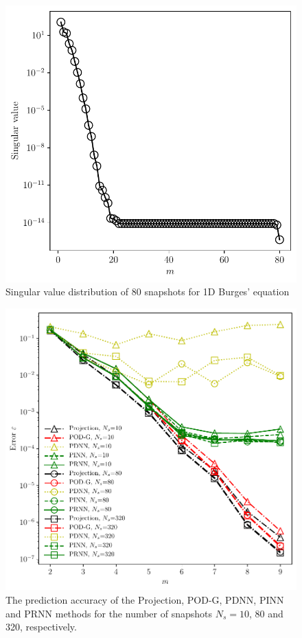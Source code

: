 \documentclass[preprint, 10pt]{elsarticle}
\begin{document}
\begin{figure}[!ht]
  \centering
  \includegraphics[width=12cm]{../../pythonNN/1DBurges/fig/SingularValues_80.pdf}
\caption{Singular value distribution of 80 snapshots for 1D Burges' equation}
\label{fig_1DBurgesSingularValues_80}
\end{figure}

\begin{figure}[!ht]
  \centering
  \includegraphics[width=12cm]{../../pythonNN/1DBurges/fig/ErrorComparsion_SampleNum.pdf}
\caption{The prediction accuracy of the Projection, POD-G, PDNN, PINN and PRNN methods for the number of snapshots $N_s=10$, 80 and 320, respectively.}
\label{fig_1DBurgesErrorComparsion_SampleNum}
\end{figure}
\end{document}
